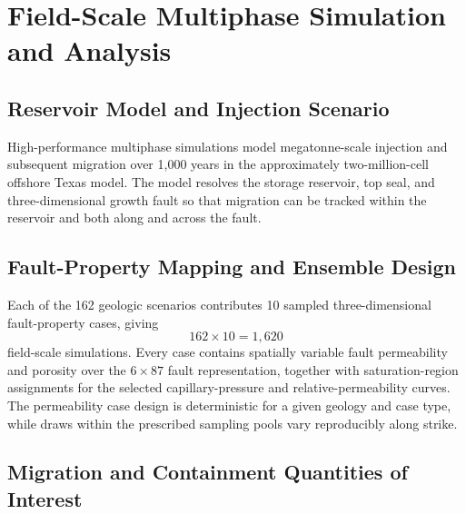 
\section{Field-Scale Multiphase Simulation and Analysis}

\subsection{Reservoir Model and Injection Scenario}

High-performance multiphase simulations model megatonne-scale \coTwo{}
injection and subsequent migration over 1,000 years in the approximately
two-million-cell offshore Texas model. The model resolves the storage
reservoir, top seal, and three-dimensional growth fault so that migration can
be tracked within the reservoir and both along and across the fault.


\subsection{Fault-Property Mapping and Ensemble Design}

Each of the 162 geologic scenarios contributes 10 sampled three-dimensional
fault-property cases, giving
\begin{equation}
162\times10 = 1{,}620
\end{equation}
field-scale simulations. Every case contains spatially variable fault
permeability and porosity over the $6\times87$ fault representation, together
with saturation-region assignments for the selected capillary-pressure and
relative-permeability curves. The permeability case design is deterministic
for a given geology and case type, while draws within the prescribed sampling
pools vary reproducibly along strike.


\subsection{Migration and Containment Quantities of Interest}

